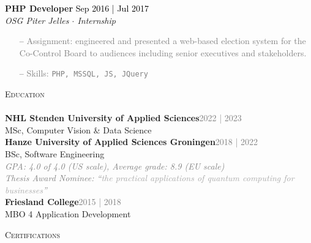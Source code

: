 \documentclass[a4paper]{article}
\newcommand{\lineunder} {
    \vspace*{-8pt} \\
    \hspace*{-18pt} \hrulefill \\
}
\newcommand{\header} [1] {
    {\hspace*{-18pt}\vspace*{6pt} \textsc{#1}}
    \vspace*{-6pt} \lineunder
}
\begin{document}
\textbf{PHP Developer} \hfill \textcolor{black}{Sep 2016 | Jul 2017}\\
\textit{OSG Piter Jelles $\cdot$ Internship}\\
\vspace{-1mm}
\begin{itemize} \itemsep 1pt
	\item[--] \textcolor{gray}{Assignment: engineered and presented a web-based election system for the Co-Control Board to audiences including senior executives and stakeholders.}
	\item[--] \textcolor{gray}{Skills: \texttt{PHP, MSSQL, JS, JQuery}}
\end{itemize}


\vspace{5mm}

\header{Education}
\vspace{2mm}
\textbf{NHL Stenden University of Applied Sciences}\hfill \textcolor{gray}{2022 | 2023}\\
MSc, Computer Vision \& Data Science\\
\vspace{4mm}
\textbf{Hanze University of Applied Sciences Groningen}\hfill \textcolor{gray}{2018 | 2022}\\
BSc, Software Engineering\\
\vspace{1mm}
\textcolor{gray}{
	\emph{GPA: 4.0 of 4.0 (US scale), Average grade: 8.9 (EU scale)}
}\\
\vspace{1mm}
\textcolor{gray}{
	\emph{Thesis Award Nominee: “\textcolor{darkgray}{the practical applications of quantum computing for businesses}”}
}\\


\vspace{4mm}
\textbf{Friesland College}\hfill \textcolor{gray}{2015 | 2018}\\
MBO 4 Application Development\\


\newpage

\header{Certifications}
\end{document}
